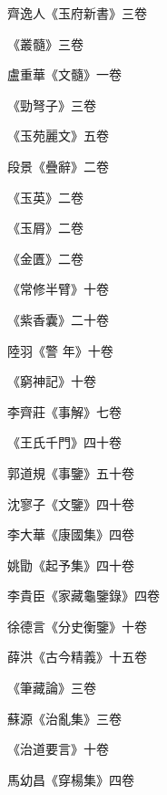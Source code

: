 \begin{pinyinscope}
 齊逸人《玉府新書》三卷



 《叢髓》三卷



 盧重華《文髓》一卷



 《勁弩子》三卷



 《玉苑麗文》五卷



 段景《疊辭》二卷



 《玉英》二卷



 《玉屑》二卷



 《金匱》二卷



 《常修半臂》十卷



 《紫香囊》二十卷



 陸羽《警
 年》十卷



 《窮神記》十卷



 李齊莊《事解》七卷



 《王氏千門》四十卷



 郭道規《事鑒》五十卷



 沈寥子《文鑒》四十卷



 李大華《康國集》四卷



 姚勖《起予集》四十卷



 李貴臣《家藏龜鑒錄》四卷



 徐德言《分史衡鑒》十卷



 薛洪《古今精義》十五卷



 《筆藏論》三卷



 蘇源《治亂集》三卷



 《治道要言》十卷



 馬幼昌《穿楊集》四卷




\end{pinyinscope}

